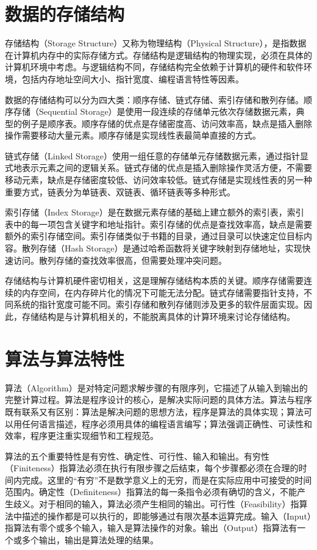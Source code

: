\documentclass[12pt, a4paper]{article}
\begin{document}
\section{数据的存储结构}

存储结构（Storage Structure）又称为物理结构（Physical Structure），是指数据在计算机内存中的实际存储方式。存储结构是逻辑结构的物理实现，必须在具体的计算机环境中考虑。与逻辑结构不同，存储结构完全依赖于计算机的硬件和软件环境，包括内存地址空间大小、指针宽度、编程语言特性等因素。

数据的存储结构可以分为四大类：顺序存储、链式存储、索引存储和散列存储。顺序存储（Sequential Storage）是使用一段连续的存储单元依次存储数据元素，典型的例子是顺序表。顺序存储的优点是存储密度高、访问效率高，缺点是插入删除操作需要移动大量元素。顺序存储是实现线性表最简单直接的方式。

链式存储（Linked Storage）使用一组任意的存储单元存储数据元素，通过指针显式地表示元素之间的逻辑关系。链式存储的优点是插入删除操作灵活方便，不需要移动元素，缺点是存储密度较低、访问效率较低。链式存储是实现线性表的另一种重要方式，链表分为单链表、双链表、循环链表等多种形式。

索引存储（Index Storage）是在数据元素存储的基础上建立额外的索引表，索引表中的每一项包含关键字和地址指针。索引存储的优点是查找效率高，缺点是需要额外的索引存储空间。索引存储类似于书籍的目录，通过目录可以快速定位目标内容。散列存储（Hash Storage）是通过哈希函数将关键字映射到存储地址，实现快速访问。散列存储的查找效率很高，但需要处理冲突问题。

存储结构与计算机硬件密切相关，这是理解存储结构本质的关键。顺序存储需要连续的内存空间，在内存碎片化的情况下可能无法分配。链式存储需要指针支持，不同系统的指针宽度可能不同。索引存储和散列存储则涉及更多的软件层面实现。因此，存储结构是与计算机相关的，不能脱离具体的计算环境来讨论存储结构。

\section{算法与算法特性}

算法（Algorithm）是对特定问题求解步骤的有限序列，它描述了从输入到输出的完整计算过程。算法是程序设计的核心，是解决实际问题的具体方法。算法与程序既有联系又有区别：算法是解决问题的思想方法，程序是算法的具体实现；算法可以用任何语言描述，程序必须用具体的编程语言编写；算法强调正确性、可读性和效率，程序更注重实现细节和工程规范。

算法的五个重要特性是有穷性、确定性、可行性、输入和输出。有穷性（Finiteness）指算法必须在执行有限步骤之后结束，每个步骤都必须在合理的时间内完成。这里的“有穷”不是数学意义上的无穷，而是在实际应用中可接受的时间范围内。确定性（Definiteness）指算法的每一条指令必须有确切的含义，不能产生歧义。对于相同的输入，算法必须产生相同的输出。可行性（Feasibility）指算法中描述的操作都是可以执行的，即能够通过有限次基本运算完成。输入（Input）指算法有零个或多个输入，输入是算法操作的对象。输出（Output）指算法有一个或多个输出，输出是算法处理的结果。
\end{document}
